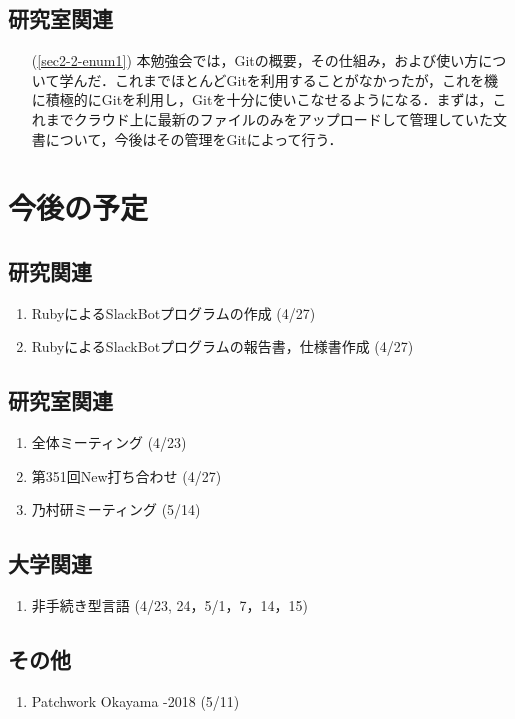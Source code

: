 \documentclass[fleqn, 14pt]{extarticle}
\begin{document}
\subsection{研究室関連}
\label{sec3-2}
\begin{itemize}
\item[(\ref{sec2-2-enum1})] 本勉強会では，Gitの概要，その仕組み，および使い方について学んだ．これまでほとんどGitを利用することがなかったが，これを機に積極的にGitを利用し，Gitを十分に使いこなせるようになる．まずは，これまでクラウド上に最新のファイルのみをアップロードして管理していた文書について，今後はその管理をGitによって行う．
\end{itemize}

\section{今後の予定}
\label{sec4}
\subsection{研究関連}
\label{sec4-1}
\begin{enumerate}
\item RubyによるSlackBotプログラムの作成
  \hfill
  \label{sec4-1-enum1}
  (4/27)
\item RubyによるSlackBotプログラムの報告書，仕様書作成
  \hfill
  \label{sec4-1-enum2}
  (4/27)
\end{enumerate}

\subsection{研究室関連}
\label{sec4-2}
\begin{enumerate}
\item 全体ミーティング
  \hfill
  \label{sec4-2-enum1}
  (4/23)
\item 第351回New打ち合わせ
  \hfill
  \label{sec4-2-enum1}
  (4/27)
\item 乃村研ミーティング
  \hfill
  \label{sec4-2-enum1}
  (5/14)
\end{enumerate}

\subsection{大学関連}
\label{sec4-3}
\begin{enumerate}
\item 非手続き型言語
  \hfill
  \label{sec4-3-enum1}
  (4/23, 24，5/1，7，14，15)
\end{enumerate}

\subsection{その他}
\label{sec4-3}
\begin{enumerate}
\item  Patchwork Okayama -2018
  \hfill
  \label{sec4-4-enum1}
  (5/11)
\end{enumerate}



\end{document}
